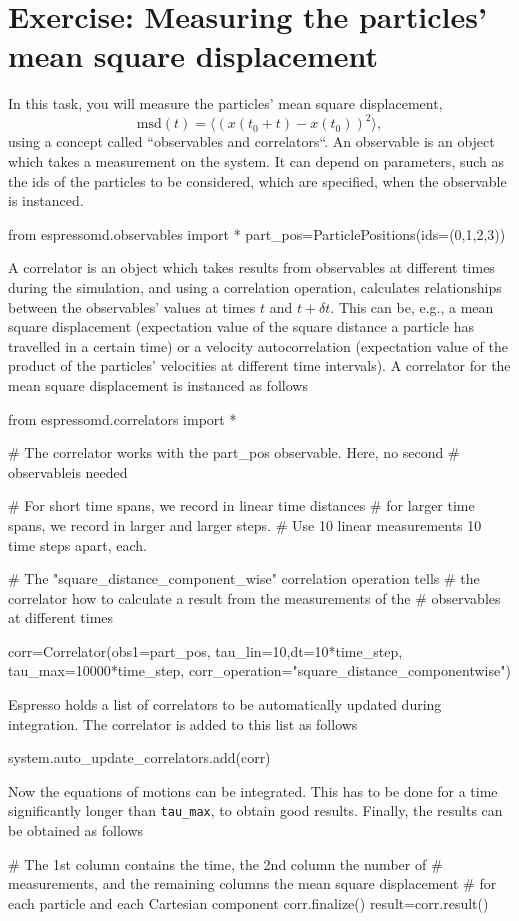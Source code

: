 \documentclass[
paper=a4,                       %
fontsize=11pt,                  %
twoside,                        %
footsepline,                    %
headsepline,                    %
headinclude=false,              %
footinclude=false,              %
pagesize,                       %
]{scrartcl}
\begin{document}
\section{Exercise: Measuring the particles' mean square displacement}

In this task, you will measure the particles' mean square displacement,
\begin{equation}
\mathrm{msd}(t) =\langle (x(t_0+t) -x(t_0))^2\rangle,
\end{equation}
using a concept called ``observables and correlators``.
An observable is an object which takes a measurement on the system. It can depend on parameters, such as the ids of the particles to be considered, which are specified, when the observable is instanced.
\begin{pypresso}
from espressomd.observables import *
part_pos=ParticlePositions(ids=(0,1,2,3))
\end{pypresso}
A correlator is an object which takes results from observables at different times during the simulation, and using a correlation operation, calculates relationships between the observables' values at times $t$ and $t+\delta t$. This can be, e.g., a mean square displacement (expectation value of the square distance a particle has travelled in a certain time) or a velocity autocorrelation (expectation value of the product of the particles' velocities at different time intervals). A correlator for the mean square displacement is instanced as follows
\begin{pypresso}
from espressomd.correlators import *

# The correlator works with the part_pos observable. Here, no second 
# observableis needed

# For short time spans, we record in linear time distances
# for larger time spans, we record in larger and larger steps.
# Use 10 linear measurements 10 time steps apart, each.

# The "square_distance_component_wise" correlation operation tells
# the correlator how to calculate a result from the measurements of the 
# observables at different times

corr=Correlator(obs1=part_pos,
                tau_lin=10,dt=10*time_step,
                tau_max=10000*time_step,
                corr_operation="square_distance_componentwise")
\end{pypresso}
Espresso holds a list of correlators to be automatically updated during integration. The correlator is added to this list as follows
\begin{pypresso}
system.auto_update_correlators.add(corr)
\end{pypresso}
Now the equations of motions can be integrated. This has to be done for a time significantly longer than \texttt{tau\_max}, to obtain good results.
Finally, the results can be obtained as follows
\begin{pypresso}
# The 1st column contains the time, the 2nd column the number of 
# measurements, and the remaining columns the mean square displacement
# for each particle and each Cartesian component
corr.finalize()
result=corr.result()
\end{pypresso}
\end{document}
